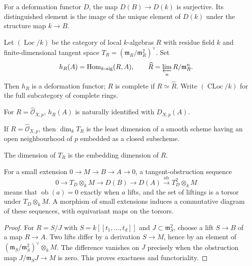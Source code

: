 \begin{remark}\label{fga-rem-6-1-11}
For a deformation functor $D$, the map $D(B)\to D(k)$ is surjective.  Its
distinguished element is the image of the unique element of $D(k)$ under the
structure map $k\to B$.
\end{remark}

\begin{definition}\label{fga-def-6-1-12}\uses{}
Let $(\operatorname{Loc}/k)$ be the category of local $k$-algebras $R$ with
residue field $k$ and finite-dimensional tangent space
$T_R=(\mathfrak m_R/\mathfrak m_R^2)^\vee$.  Set
\[
h_R(A)=\operatorname{Hom}_{k\text{-alg}}(R,A),\qquad
\widehat R=\varprojlim_nR/\mathfrak m_R^n.
\]
Then $h_R$ is a deformation functor; $R$ is complete if $R\simeq\widehat R$.
Write $(\operatorname{CLoc}/k)$ for the full subcategory of complete rings.
\end{definition}

\begin{remark}\label{fga-rem-6-1-14}
For $R=\widehat{\mathcal O}_{X,p}$, $h_R(A)$ is naturally identified with
$D_{X,p}(A)$.
\end{remark}

\begin{remark}\label{fga-rem-6-1-15}
If $R=\widehat{\mathcal O}_{X,p}$, then $\dim_kT_R$ is the least dimension of a
smooth scheme having an open neighbourhood of $p$ embedded as a closed
subscheme.
\end{remark}

\begin{definition}\label{fga-def-6-1-16}\uses{}
The dimension of $T_R$ is the embedding dimension of $R$.
\end{definition}

\begin{remark}\label{fga-rem-6-1-20}
For a small extension $0\to M\to B\to A\to0$, a tangent-obstruction sequence
\[
0\to T_D\otimes_kM\to D(B)\to D(A)
 \xrightarrow{\operatorname{ob}}T^2_D\otimes_kM
\]
means that $\operatorname{ob}(a)=0$ exactly when $a$ lifts, and the set of
liftings is a torsor under $T_D\otimes_kM$.  A morphism of small extensions
induces a commutative diagram of these sequences, with equivariant maps on the
torsors.
\end{remark}
\begin{proof}
For $R=S/J$ with $S=k[[t_1,\ldots,t_d]]$ and $J\subset\mathfrak m_S^2$, choose
a lift $S\to B$ of a map $R\to A$.  Two lifts differ by a derivation
$S\to M$, hence by an element of $(\mathfrak m_S/\mathfrak m_S^2)^\vee\otimes_kM$.
The difference vanishes on $J$ precisely when the obstruction map
$J/\mathfrak m_SJ\to M$ is zero.  This proves exactness and functoriality.
\end{proof}

